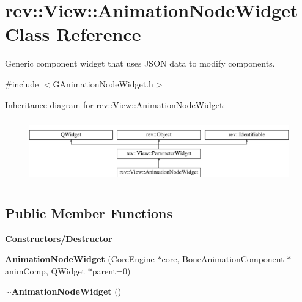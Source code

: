 \hypertarget{classrev_1_1_view_1_1_animation_node_widget}{}\section{rev\+::View\+::Animation\+Node\+Widget Class Reference}
\label{classrev_1_1_view_1_1_animation_node_widget}


Generic component widget that uses J\+S\+ON data to modify components.  




{\ttfamily \#include $<$G\+Animation\+Node\+Widget.\+h$>$}

Inheritance diagram for rev\+::View\+::Animation\+Node\+Widget\+:\begin{figure}[H]
\begin{center}
\leavevmode
\includegraphics[height=2.772277cm]{classrev_1_1_view_1_1_animation_node_widget}
\end{center}
\end{figure}
\subsection*{Public Member Functions}
\begin{Indent}\textbf{ Constructors/\+Destructor}\par
\begin{DoxyCompactItemize}
\item 
\mbox{\label{classrev_1_1_view_1_1_animation_node_widget_a66461f59955130b634dff659248e256a}} 
{\bfseries Animation\+Node\+Widget} (\mbox{\hyperlink{classrev_1_1_core_engine}{Core\+Engine}} $\ast$core, \mbox{\hyperlink{classrev_1_1_bone_animation_component}{Bone\+Animation\+Component}} $\ast$anim\+Comp, Q\+Widget $\ast$parent=0)
\item 
\mbox{\label{classrev_1_1_view_1_1_animation_node_widget_aeb616aee0e05e8a809d6c157e90ac99a}} 
{\bfseries $\sim$\+Animation\+Node\+Widget} ()
\end{DoxyCompactItemize}
\end{Indent}
